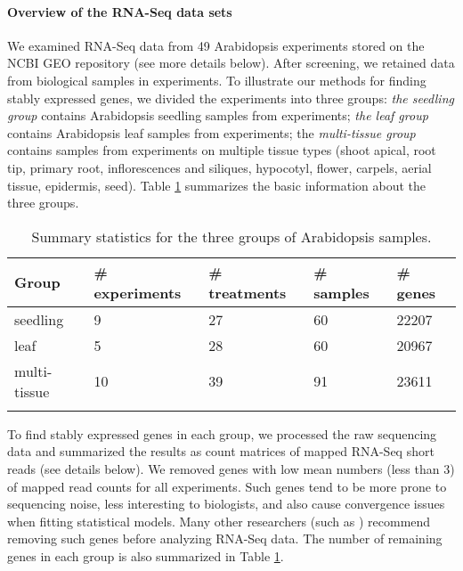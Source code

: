\paragraph{Overview of the RNA-Seq data sets}
We examined RNA-Seq data from 49 Arabidopsis experiments stored on the NCBI
GEO repository (see more details below). After screening, we retained data
from \howmanySamples biological samples in \howmanylab experiments.  To illustrate our methods
for finding stably expressed genes, we divided the experiments into three
groups: \textit{the seedling group} contains \howmanyseedlingsample Arabidopsis seedling samples
from \howmanyseedlingexperiment experiments; \textit{ the leaf group} contains \howmanyleafsample 
Arabidopsis leaf
samples from \howmanyleafexperiment experiments;  the \textit{multi-tissue group} contains 
\howmanytissuesample
samples from \howmanytissueexperiment experiments on multiple tissue types (shoot apical, root tip,
primary root, inflorescences and siliques, hypocotyl, flower, carpels, aerial
tissue, epidermis, seed).  Table \ref{table:TableSet3} summarizes the basic information about
the three groups.
\begin{table}[!ht]
	\centering
	\caption[Summary statistics for the three groups of Arabidopsis samples]{Summary statistics for 
	the three groups of Arabidopsis samples.}
	\begin{tabular}{lp{2.4cm}p{2.3cm}p{2cm}p{1.5cm}} \hline
		Group & \#  experiments & \# treatments  & \# samples & \# genes \\ \hline
		seedling &   9 &  27 &  60 & 22207 \\ 
		leaf &   5 &  28 &  60 & 20967 \\ 
		multi-tissue &  10 &  39 &  91 & 23611 \\ \hline
		\label{table:TableSet3}
	\end{tabular}
\end{table}

To find stably expressed genes in each group, we processed the raw
sequencing data and summarized the results as count matrices of mapped RNA-Seq
short reads (see details below).  We removed genes with low mean numbers (less
than 3) of mapped read counts for all experiments.  Such genes tend to be more prone to sequencing
noise, less interesting to biologists, and also cause convergence issues when
fitting statistical models. Many other researchers (such as \citealt{anders2013count})
recommend removing such genes before analyzing RNA-Seq data.  The number of
remaining genes in each group is also summarized in Table
\ref{table:TableSet3}.


